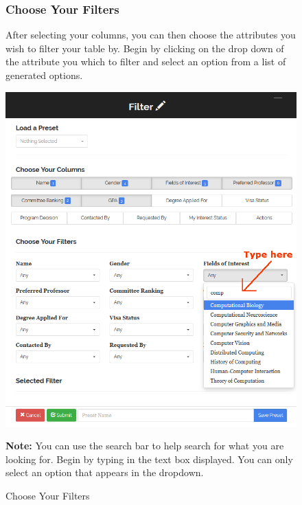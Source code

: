 \documentclass[fontsize=12pt,paper=letter,twoside]{scrartcl}
\begin{document}
\begin{figure}[!htb]
\subsubsection{Choose Your Filters}
After selecting your columns, you can then choose the attributes you wish to filter your table by. Begin by clicking on the drop down of the attribute you which to filter and select an option from a list of generated options.
\begin{center}
\includegraphics[width=.99\textwidth]{images/choose_filters.png}
\end{center}
\caption{Choose Your Filters}
\textbf{Note:} You can use the search bar to help search for what you are looking for. Begin by typing in the text box displayed. You can only select an option that appears in the dropdown.
\label{fig:choose_filters}
\end{figure}
\end{document}
